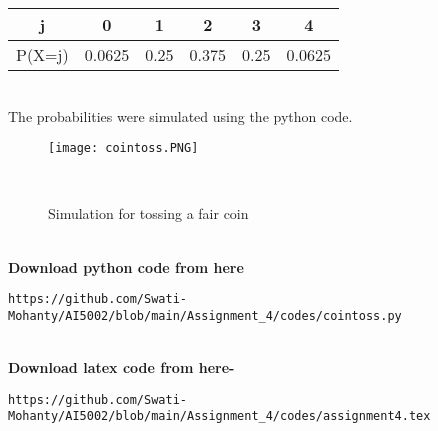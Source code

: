 \documentclass[journal,12pt,twocolumn]{IEEEtran}
\begin{document}
\begin{center}
\begin{tabular}{ |c|c|c|c|c|c| } 
 \hline
 j & 0 & 1 & 2 & 3 & 4 \\ \hline
 P(X=j) & 0.0625 & 0.25 & 0.375 & 0.25 & 0.0625 \\ 
 \hline
\end{tabular}
\end{center}
\\The probabilities were simulated using the python code.
\begin{figure}[h]
\renewcommand{\theenumi}{1}
\centering
\texttt{[image: cointoss.PNG]}
\caption{Simulation for tossing a fair coin  }
\label{Fig:1}
\\

\end{figure}


\\\textbf{Download python code from here}\\
\begin{lstlisting}
https://github.com/Swati-Mohanty/AI5002/blob/main/Assignment_4/codes/cointoss.py
\end{lstlisting}
\\\textbf{Download latex code from here-}\\
\begin{lstlisting}
https://github.com/Swati-Mohanty/AI5002/blob/main/Assignment_4/codes/assignment4.tex
\end{lstlisting}
\end{document}
